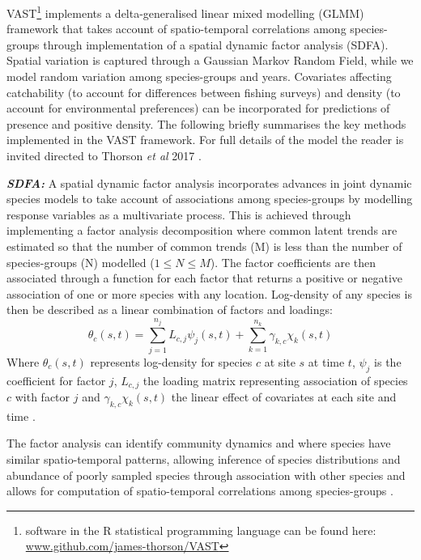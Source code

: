 \documentclass{nature}
\begin{document}
\begin{linenumbers}
VAST\footnote{software in the R statistical programming language can be found
	here: \url{www.github.com/james-thorson/VAST}} implements a
delta-generalised linear mixed modelling (GLMM) framework that takes account of
spatio-temporal correlations among species-groups through implementation of a
spatial dynamic factor analysis (SDFA). Spatial variation is captured through a
Gaussian Markov Random Field, while we model random variation among
species-groups and years. Covariates affecting catchability (to account for
differences between fishing surveys) and density (to account for environmental
preferences) can be incorporated for predictions of presence and positive
density. The following briefly summarises the key methods implemented in the
VAST framework. For full details of the model the reader is invited directed to
Thorson \textit{et al} 2017 \cite{Thorson2017}.

\textbf{\textit{SDFA:}} A spatial dynamic factor analysis incorporates
advances in joint dynamic species models \cite{Thorson2017} to take account
of associations among species-groups by modelling response variables
as a multivariate process. This is achieved through implementing a factor
analysis decomposition where common latent trends are estimated so that the
number of common trends (M) is less than the number of species-groups (N)
modelled ($1 \leq N \leq M$). The factor coefficients are then associated
through a function for each factor that returns a positive or negative
association of one or more species with any location. Log-density of any
species is then be described as a linear combination of factors and loadings:
	\begin{equation}
		\theta_{c}(s,t) = \sum_{j=1}^{n_{j}}
		L_{c,j}\psi_{j}(s,t) +\sum_{k=1}^{n_{k}}
		\gamma_{k,c}\chi_{k}(s,t)
	\end{equation}
Where $\theta_{c}(s,t)$ represents log-density for species $c$ at site $s$ at
time $t$, $\psi_{j}$ is the coefficient for factor $j$, $L_{c,j}$ the loading
matrix representing association of species $c$ with factor $j$ and
$\gamma_{k,c}\chi_{k}(s,t)$ the linear effect of covariates at each site and
time \cite{Thorson2016b}. 

The factor analysis can identify community dynamics and where species have
similar spatio-temporal patterns, allowing inference of species distributions
and abundance of poorly sampled species through association with other species
and allows for computation of spatio-temporal correlations among species-groups
\cite{Thorson2016b}.


\end{linenumbers}
\end{document}
